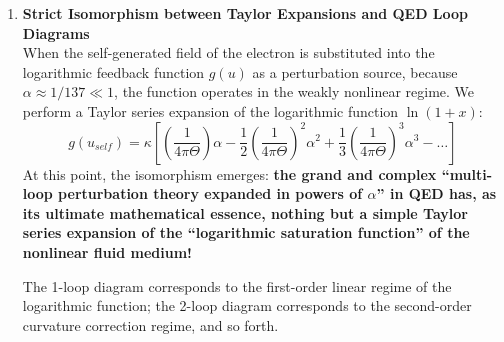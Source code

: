 \documentclass[12pt, a4paper]{article}
\begin{document}
\begin{enumerate}
    \item \textbf{Strict Isomorphism between Taylor Expansions and QED Loop Diagrams} \\
    When the self-generated field of the electron is substituted into the logarithmic feedback function $g(u)$ as a perturbation source, because $\alpha \approx 1/137 \ll 1$, the function operates in the weakly nonlinear regime. We perform a Taylor series expansion of the logarithmic function $\ln(1+x)$:
    \begin{equation}
    g(u_{self}) = \kappa \left[ \left(\frac{1}{4\pi\Theta}\right) \alpha - \frac{1}{2}\left(\frac{1}{4\pi\Theta}\right)^2 \alpha^2 + \frac{1}{3}\left(\frac{1}{4\pi\Theta}\right)^3 \alpha^3 - \dots \right]
    \end{equation}
    At this point, the isomorphism emerges: \textbf{the grand and complex ``multi-loop perturbation theory expanded in powers of $\alpha$'' in QED has, as its ultimate mathematical essence, nothing but a simple Taylor series expansion of the ``logarithmic saturation function'' of the nonlinear fluid medium!}
    
    The 1-loop diagram corresponds to the first-order linear regime of the logarithmic function; the 2-loop diagram corresponds to the second-order curvature correction regime, and so forth.
    

\end{enumerate}
\end{document}
